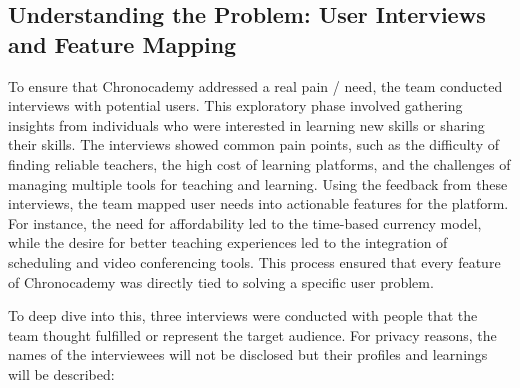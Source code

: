\subsection{Understanding the Problem: User Interviews and Feature Mapping}\label{subsec:user-interviews-feature-mapping}
To ensure that Chronocademy addressed a real pain / need, the team conducted interviews with potential users.
This exploratory phase involved gathering insights from individuals who were interested in learning new skills or sharing their skills.
The interviews showed common pain points, such as the difficulty of finding reliable teachers, the high cost of learning platforms, and the challenges of managing multiple tools for teaching and learning.
Using the feedback from these interviews, the team mapped user needs into actionable features for the platform.
For instance, the need for affordability led to the time-based currency model, while the desire for better teaching experiences led to the integration of scheduling and video conferencing tools.
This process ensured that every feature of Chronocademy was directly tied to solving a specific user problem.

To deep dive into this, three interviews were conducted with people that the team thought fulfilled or represent the target audience.
For privacy reasons, the names of the interviewees will not be disclosed but their profiles and learnings will be described:

